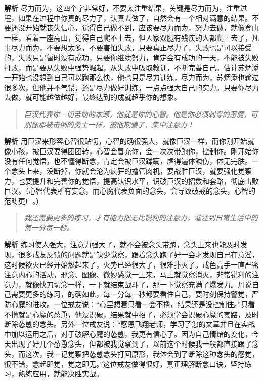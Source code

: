 \textbf{解析} 尽力而为，这四个字非常好，不要太注重结果，关键是尽力而为，注重过程，如果在过程中你真的尽力了，认真去做了，自然会有一个相对满意的结果。不要还没开始就丧失信心，觉得自己做不到，应该要尽力而为，努力去做，就像登山一样，看着一座高山，觉得自己爬不上去，但人家双腿有残疾的人都爬上去了，凡事尽力而为，不要想太多，不要害怕失败，只要真正尽力了，失败也是可以接受的，失败只是暂时没有成功，只要你继续努力，肯定会有成功的一天，不能被失败打败，而是要从失败中强势崛起，从失败中吸取教训，不断完善自己。估计苏炳添一开始也没想到自己可以跑那么快，他也只是尽力训练，尽力而为，苏炳添也输过很多次，但他并不气馁，还是尽力做好训练，一点点强大自己的实力。只要你尽力去做，就可能越做越好，最终达到的成就超乎你的想象。

\begin{quote}\it
    巨汉代表你一切苦恼的本源，他就是你的心智。他是你必须刺穿的恶魔，可别像那被击倒的勇士一样，被他欺骗了，集中注意力！
\end{quote}

\textbf{解析} 用巨汉来形容心智很贴切，心智的确很强大，就像巨汉一样，而你刚开始就像小孩，被巨汉耍得团团转，心智会冒充你，会一次次带跑你，控制你。刚开始你没有任何觉悟，也不懂得断念，肯定会被巨汉蹂躏，虐得遍体鳞伤，体无完肤。一个念头上来，没断掉，你就会沦为疯狂的撸管肉机，要战胜巨汉，就要强化觉察力，也要提升和完善你的觉悟，提高认识水平，识破巨汉的招数和套路，彻底击败巨汉。（心智代表所有妄念，而心魔代表负面的念头，会导致破戒的念头，心智的范畴更广。）

\begin{quote}\it
    我还需要更多的练习，才有能力把无比锐利的注意力，灌注到日常生活中的每一分每一秒。
\end{quote}

\textbf{解析} 练习使人强大，注意力强大了，就不会被念头带跑，念头上来也能及时发现，很多戒友反馈的问题就是缺少觉察，跟着念头跑了好一会才发现自己在意淫，这时候欲火已经开始燃起来了，火势已经很大了，很难扑灭了。戒色高手一直严密注意内心的活动，邪念、图像、微妙感觉一上来，马上就觉察消灭，非常锐利的注意力，就像快刀切念一样，一下就结束战斗了，那一下觉察充满了爆发力。丹说自己需要更多的练习，的确如此，每一分每一秒都要看住自己，要时刻保持警觉，严防心魔的进攻。一位戒友说：“心里想着只看一会不撸，结果还是没控制住。”只看不撸就是心魔的怂恿，他没识破，结果就中招了，必须学会识破心魔的套路，及时断除怂恿的念头。另外一位戒友说：“感恩飞翔老师，学习了您的文章并且在实战中加以运用之后，对于破解心魔的怂恿，我更有信心了。因为自己情绪的变化，今天出现了好几个怂恿念头，但都被我觉察到了，以前这个时候我一般都直接跟了念头，而这次，我一记觉察把怂恿念头打回原形，我体会到了断除这种念头的感觉，很不错，念起即觉，觉之即无。”这位戒友做得很好，真正理解断念口诀，坚持练习，熟练应用，就能决胜实战。

